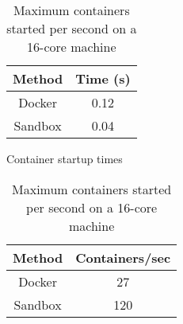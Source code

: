 \begin{table}[h]
    \centering
    \begin{subtable}[t]{0.38\textwidth}
        \centering
        \vspace{-8pt} %
        \begin{tabular}{|c|c|}
            \hline
            \textbf{Method} & \textbf{Time (s)} \\
            \hline
            Docker & 0.12 \\
            Sandbox & 0.04 \\
            \hline
        \end{tabular}
        \caption{Container startup times}
        \vspace{-12pt}
        \label{tab:startup_times}
    \end{subtable}\hfill
    \begin{subtable}[t]{0.58\textwidth}
        \centering
        \vspace{-8pt}
        \begin{tabular}{|c|c|}
            \hline
            \textbf{Method} & \textbf{Containers/sec} \\
            \hline
            Docker & 27 \\
            Sandbox & 120 \\
            \hline
        \end{tabular}
        \caption{Maximum containers started per second on a 16-core machine}
        \vspace{-12pt}
        \label{tab:containers_per_second}
    \end{subtable}
\end{table}